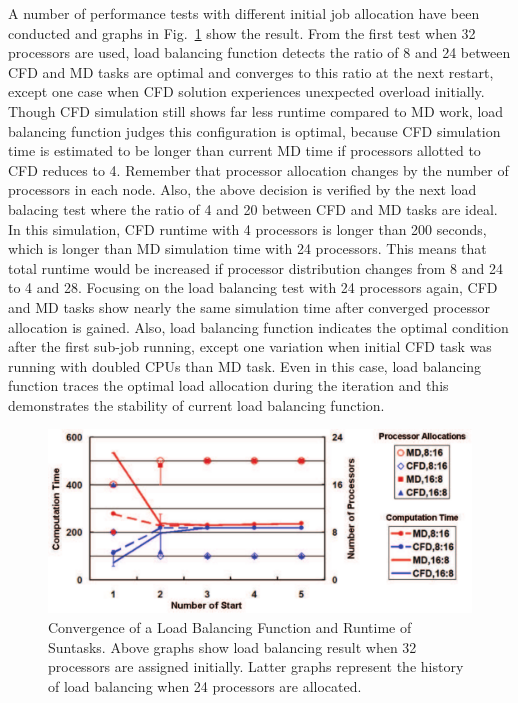 \documentclass[conference,final]{IEEEtran}
\begin{document}
A number of performance tests with different initial job allocation have been conducted 
and graphs in Fig.~\ref{fig:LB_Graph} show the result. From the first test when 32 
processors are used, load balancing function detects the ratio of 8 and 24 between CFD 
and MD tasks are optimal and converges to this ratio at the next restart, except one case 
when CFD solution experiences unexpected overload initially. Though CFD simulation still 
shows far less runtime compared to MD work, load balancing function judges this 
configuration is optimal, because CFD simulation time is estimated to be longer than 
current MD time if processors allotted to CFD reduces to 4. Remember that processor 
allocation changes by the number of processors in each node. Also, the above decision is 
verified by the next load balacing test where the ratio of 4 and 20 between CFD and MD 
tasks are ideal. In this simulation, CFD runtime with 4 processors is longer than 200 
seconds, which is longer than MD simulation time with 24 processors. This means that 
total runtime would be increased if processor distribution changes from 8 and 24 to 4 and 
28. Focusing on the load balancing test with 24 processors again, CFD and MD tasks show 
nearly the same simulation time after converged processor allocation is gained. Also, 
load balancing function indicates the optimal condition after the first sub-job running, 
except one variation when initial CFD task was running with doubled CPUs than MD task. 
Even in this case, load balancing function traces the optimal load allocation during the 
iteration and this demonstrates the stability of current load balancing function.

\begin{figure}
\centering
\includegraphics[scale=0.25]{LB_Graph}
\caption{\small Convergence of a Load Balancing Function and Runtime of Suntasks. Above 
graphs show load balancing result when 32 processors are assigned initially. Latter 
graphs represent the history of load balancing when 24 processors are allocated.}
\label{fig:LB_Graph}
\end{figure}
\end{document}
